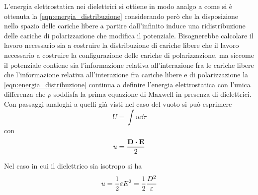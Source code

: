 L'energia elettrostatica nei dielettrici si ottiene in modo analgo a come si è ottenuta la \eqref{eqn:energia_distribuzione}
considerando però che la disposizione nello spazio delle cariche libere a partire dall'infinito
induce una ridistribuzione delle cariche di polarizzazione che modifica il potenziale.
Bisognerebbe calcolare il lavoro necessario sia a costruire la distribuzione di cariche libere
che il lavoro necessario a costruire la configurazione delle cariche di polarizzazione,
ma siccome il potenziale contiene sia l'informazione relativa all'interazione fra le cariche libere
che l'informazione relativa all'interazione fra cariche libere e di polarizzazione
la \eqref{eqn:energia_distribuzione} continua a definire l'energia elettrostatica
con l'unica differenza che $\rho$ soddisfa la prima equazione di Maxwell in presenza di dielettrici.
Con passaggi analoghi a quelli già visti nel caso del vuoto si può esprimere
\[
U=\int u\dd{\tau}
\]
con
\[
u=\frac{\vb{D}\vdot\vb{E}}{2}
\]

Nel caso in cui il dielettrico sia isotropo si ha
\[
u=\frac{1}{2}\varepsilon E^2=\frac{1}{2}\frac{D^2}{\varepsilon}
\]
